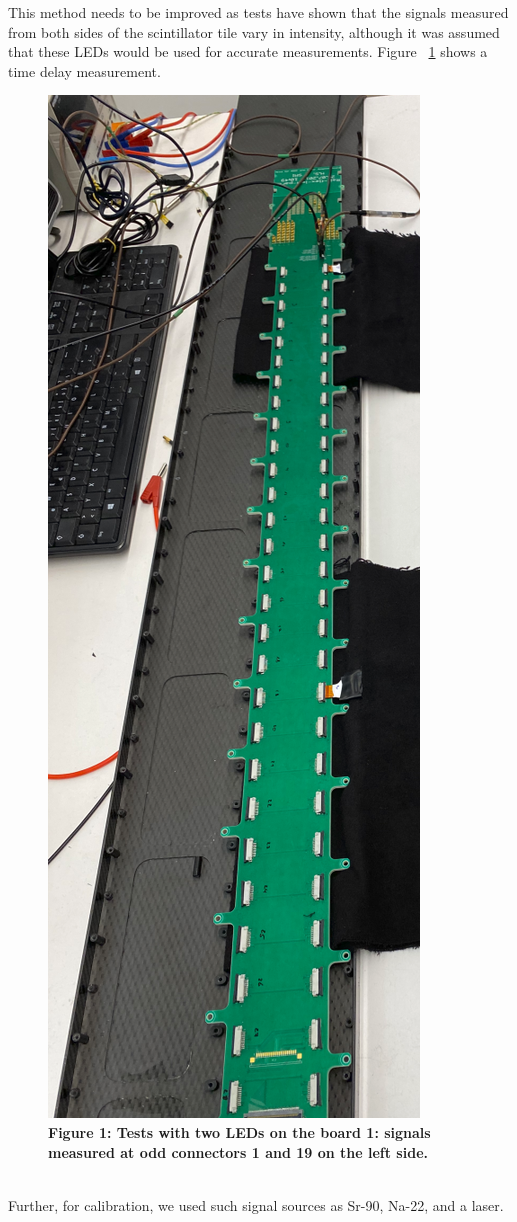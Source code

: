 \documentclass[../BTOF_summary.tex]{subfiles}
\begin{document}
This method needs to be improved as tests have shown that the signals measured from both sides of the scintillator tile vary in intensity, although it was assumed that these LEDs would be used for accurate measurements.
Figure ~\ref{fig:TD} shows a time delay measurement.
\\
\begin{figure}[h!]
\includegraphics[scale=0.2, angle =270]{Pictures/pic1.png}
\\
\textbf{Figure 1: Tests with two LEDs on the board 1: signals measured at odd connectors 1 and 19 on the left side.}
\label{fig:TD}
\end{figure}
\\
Further, for calibration, we used such signal sources as Sr-90, Na-22, and a laser.
\end{document}
